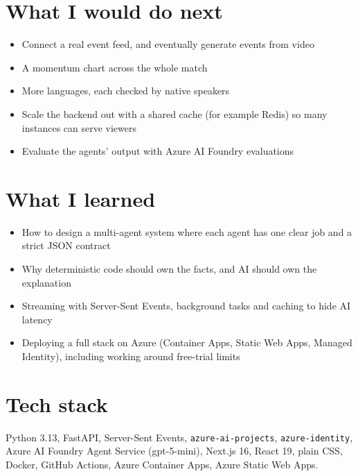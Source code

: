 \documentclass[11pt,a4paper]{article}
\newcommand{\code}[1]{\texttt{#1}}
\begin{document}
\section{What I would do next}

\begin{itemize}
  \item Connect a real event feed, and eventually generate events from video
  \item A momentum chart across the whole match
  \item More languages, each checked by native speakers
  \item Scale the backend out with a shared cache (for example Redis) so many instances can serve viewers
  \item Evaluate the agents' output with Azure AI Foundry evaluations
\end{itemize}

\section{What I learned}

\begin{itemize}
  \item How to design a multi-agent system where each agent has one clear job and a strict JSON contract
  \item Why deterministic code should own the facts, and AI should own the explanation
  \item Streaming with Server-Sent Events, background tasks and caching to hide AI latency
  \item Deploying a full stack on Azure (Container Apps, Static Web Apps, Managed Identity), including working around free-trial limits
\end{itemize}

\section*{Tech stack}

Python 3.13, FastAPI, Server-Sent Events, \code{azure-ai-projects}, \code{azure-identity}, Azure AI Foundry Agent Service (gpt-5-mini), Next.js 16, React 19, plain CSS, Docker, GitHub Actions, Azure Container Apps, Azure Static Web Apps.
\end{document}
